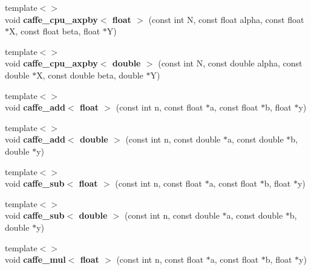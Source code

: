 \begin{DoxyCompactItemize}
\item 
{\footnotesize template$<$$>$ }\\void {\bfseries caffe\+\_\+cpu\+\_\+axpby$<$ float $>$} (const int N, const float alpha, const float $\ast$X, const float beta, float $\ast$Y)\hypertarget{namespacecaffe_a80cee6f8f71d4d64423b07251a369c98}{}\label{namespacecaffe_a80cee6f8f71d4d64423b07251a369c98}

\item 
{\footnotesize template$<$$>$ }\\void {\bfseries caffe\+\_\+cpu\+\_\+axpby$<$ double $>$} (const int N, const double alpha, const double $\ast$X, const double beta, double $\ast$Y)\hypertarget{namespacecaffe_acdfc74a60bc50fffe61fd27484b6b795}{}\label{namespacecaffe_acdfc74a60bc50fffe61fd27484b6b795}

\item 
{\footnotesize template$<$$>$ }\\void {\bfseries caffe\+\_\+add$<$ float $>$} (const int n, const float $\ast$a, const float $\ast$b, float $\ast$y)\hypertarget{namespacecaffe_a33de0e8c285c49d3388dd9b36cfae096}{}\label{namespacecaffe_a33de0e8c285c49d3388dd9b36cfae096}

\item 
{\footnotesize template$<$$>$ }\\void {\bfseries caffe\+\_\+add$<$ double $>$} (const int n, const double $\ast$a, const double $\ast$b, double $\ast$y)\hypertarget{namespacecaffe_a7e191890a0b953fafbb5cabb94c185fd}{}\label{namespacecaffe_a7e191890a0b953fafbb5cabb94c185fd}

\item 
{\footnotesize template$<$$>$ }\\void {\bfseries caffe\+\_\+sub$<$ float $>$} (const int n, const float $\ast$a, const float $\ast$b, float $\ast$y)\hypertarget{namespacecaffe_ad95d5c303539634141319733138a1a30}{}\label{namespacecaffe_ad95d5c303539634141319733138a1a30}

\item 
{\footnotesize template$<$$>$ }\\void {\bfseries caffe\+\_\+sub$<$ double $>$} (const int n, const double $\ast$a, const double $\ast$b, double $\ast$y)\hypertarget{namespacecaffe_afbe160a31cb8ba24b9a458b29dd30b29}{}\label{namespacecaffe_afbe160a31cb8ba24b9a458b29dd30b29}

\item 
{\footnotesize template$<$$>$ }\\void {\bfseries caffe\+\_\+mul$<$ float $>$} (const int n, const float $\ast$a, const float $\ast$b, float $\ast$y)\hypertarget{namespacecaffe_a6c2ce80409bbcc2f7628245d0d0961d8}{}\label{namespacecaffe_a6c2ce80409bbcc2f7628245d0d0961d8}


\end{DoxyCompactItemize}

